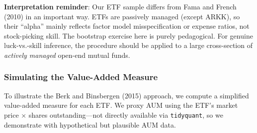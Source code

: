 \documentclass[
  letterpaper,
  DIV=11,
  numbers=noendperiod]{scrartcl}
\begin{document}
\begin{tcolorbox}[enhanced jigsaw, arc=.35mm, bottomrule=.15mm, bottomtitle=1mm, breakable, colback=white, colbacktitle=quarto-callout-note-color!10!white, colframe=quarto-callout-note-color-frame, coltitle=black, left=2mm, leftrule=.75mm, opacityback=0, opacitybacktitle=0.6, rightrule=.15mm, title=\textcolor{quarto-callout-note-color}{\faInfo}\hspace{0.5em}{Note}, titlerule=0mm, toprule=.15mm, toptitle=1mm]

\textbf{Interpretation reminder}: Our ETF sample differs from Fama and
French (2010) in an important way. ETFs are passively managed (except
ARKK), so their ``alpha'' mainly reflects factor model misspecification
or expense ratios, not stock-picking skill. The bootstrap exercise here
is purely pedagogical. For genuine luck-vs.-skill inference, the
procedure should be applied to a large cross-section of \emph{actively
managed} open-end mutual funds.

\end{tcolorbox}

\subsubsection{Simulating the Value-Added
Measure}\label{simulating-the-value-added-measure}

To illustrate the Berk and Binsbergen (2015) approach, we compute a
simplified value-added measure for each ETF. We proxy AUM using the
ETF's market price × shares outstanding---not directly available via
\texttt{tidyquant}, so we demonstrate with hypothetical but plausible
AUM data.
\end{document}
